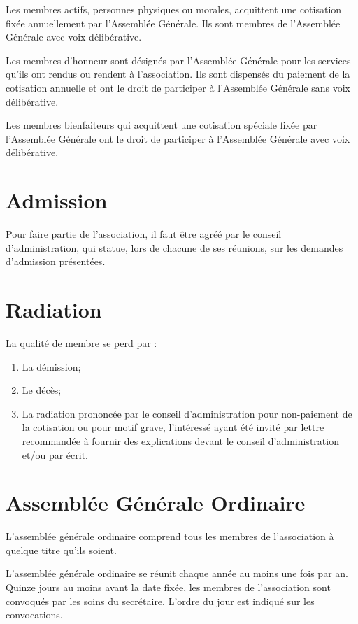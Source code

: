 \documentclass[12pt]{constitution}
\begin{document}
\medskip
Les membres actifs, personnes physiques ou morales, acquittent une cotisation fixée annuellement par l'Assemblée Générale. Ils sont membres de l'Assemblée Générale avec voix délibérative.

\medskip
Les membres d'honneur sont désignés par l'Assemblée Générale pour les services qu'ils ont rendus ou rendent à l'association. Ils sont dispensés du paiement de la cotisation annuelle et ont le droit de participer à l'Assemblée Générale sans voix délibérative.

\medskip
Les membres bienfaiteurs qui acquittent une cotisation spéciale fixée par l'Assemblée Générale ont le droit de participer à l'Assemblée Générale avec voix délibérative.

\section{Admission}
Pour faire partie de l'association, il faut être agréé par le conseil d’administration, qui statue, lors de chacune de ses réunions, sur les demandes d'admission présentées.

\section{Radiation}
La qualité de membre se perd par :
\begin{enumerate}
	\item La démission;
	\item Le décès;
	\item La radiation prononcée par le conseil d'administration pour non-paiement de la cotisation ou pour motif grave, l'intéressé ayant été invité par lettre recommandée à fournir des explications devant le conseil d'administration et/ou par écrit. 
\end{enumerate}


\section{Assemblée Générale Ordinaire}
\label{AGO}
L'assemblée générale ordinaire comprend tous les membres de l'association à quelque titre qu'ils soient.

\medskip
L’assemblée générale ordinaire se réunit chaque année au moins une fois par an. Quinze jours au moins avant la date fixée, les membres de l’association sont convoqués par les soins du secrétaire. L’ordre du jour est indiqué sur les convocations.
\end{document}
